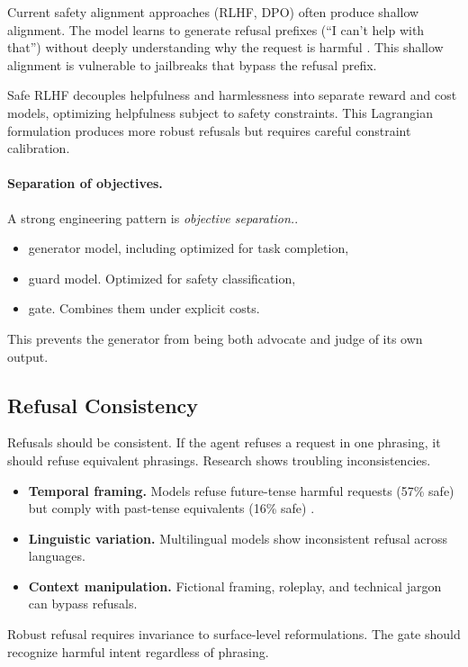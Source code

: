 Current safety alignment approaches (RLHF, DPO) often produce shallow alignment. The model learns to generate refusal prefixes (``I can't help with that'') without deeply understanding why the request is harmful \cite{qi2025shallow}. This shallow alignment is vulnerable to jailbreaks that bypass the refusal prefix.

Safe RLHF \cite{dai2024safe} decouples helpfulness and harmlessness into separate reward and cost models, optimizing helpfulness subject to safety constraints. This Lagrangian formulation produces more robust refusals but requires careful constraint calibration.

\paragraph{Separation of objectives.}
A strong engineering pattern is \emph{objective separation.}.
\begin{itemize}
\item generator model, including optimized for task completion,
\item guard model. Optimized for safety classification,
\item gate. Combines them under explicit costs.
\end{itemize}
This prevents the generator from being both advocate and judge of its own output.

\subsection{Refusal Consistency}

Refusals should be consistent. If the agent refuses a request in one phrasing, it should refuse equivalent phrasings. Research shows troubling inconsistencies.
\begin{itemize}
\item \textbf{Temporal framing.} Models refuse future-tense harmful requests (57\% safe) but comply with past-tense equivalents (16\% safe) \cite{andriushchenko2025temporal}.
\item \textbf{Linguistic variation.} Multilingual models show inconsistent refusal across languages.
\item \textbf{Context manipulation.} Fictional framing, roleplay, and technical jargon can bypass refusals.
\end{itemize}

Robust refusal requires invariance to surface-level reformulations. The gate should recognize harmful intent regardless of phrasing.

